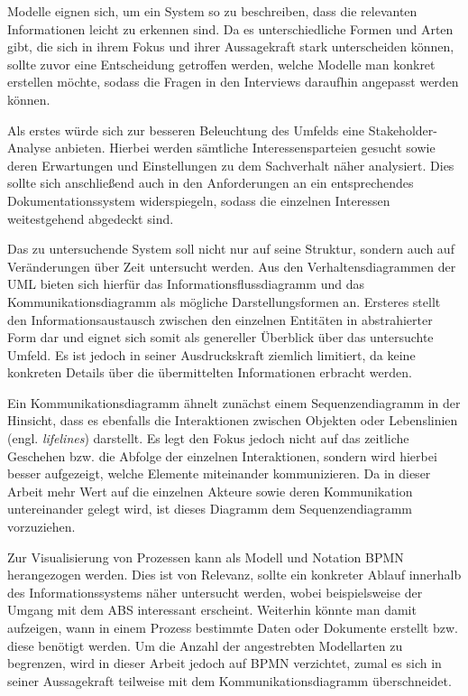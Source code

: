 Modelle eignen sich, um ein System so zu beschreiben, dass die relevanten Informationen leicht zu erkennen sind. Da es unterschiedliche Formen und Arten gibt, die sich in ihrem Fokus und ihrer Aussagekraft stark unterscheiden können, sollte zuvor eine Entscheidung getroffen werden, welche Modelle man konkret erstellen möchte, sodass die Fragen in den Interviews daraufhin angepasst werden können.

Als erstes würde sich zur besseren Beleuchtung des Umfelds eine Stakeholder-Analyse anbieten. Hierbei werden sämtliche Interessensparteien gesucht sowie deren Erwartungen und Einstellungen zu dem Sachverhalt näher analysiert. Dies sollte sich anschließend auch in den Anforderungen an ein entsprechendes Dokumentationssystem widerspiegeln, sodass die einzelnen Interessen weitestgehend abgedeckt sind.

Das zu untersuchende System soll nicht nur auf seine Struktur, sondern auch auf Veränderungen über Zeit untersucht werden. Aus den Verhaltensdiagrammen der UML bieten sich hierfür das Informationsflussdiagramm und das Kommunikationsdiagramm als mögliche Darstellungsformen an. Ersteres stellt den Informationsaustausch zwischen den einzelnen Entitäten in abstrahierter Form dar und eignet sich somit als genereller Überblick über das untersuchte Umfeld. Es ist jedoch in seiner Ausdruckskraft ziemlich limitiert, da keine konkreten Details über die übermittelten Informationen erbracht werden.

Ein Kommunikationsdiagramm ähnelt zunächst einem Sequenzendiagramm in der Hinsicht, dass es ebenfalls die Interaktionen zwischen Objekten oder Lebenslinien (engl. \textit{lifelines}) darstellt. Es legt den Fokus jedoch nicht auf das zeitliche Geschehen bzw. die Abfolge der einzelnen Interaktionen, sondern wird hierbei besser aufgezeigt, welche Elemente miteinander kommunizieren. Da in dieser Arbeit mehr Wert auf die einzelnen Akteure sowie deren Kommunikation untereinander gelegt wird, ist dieses Diagramm dem Sequenzendiagramm vorzuziehen.

Zur Visualisierung von Prozessen kann als Modell und Notation BPMN herangezogen werden. Dies ist von Relevanz, sollte ein konkreter Ablauf innerhalb des Informationssystems näher untersucht werden, wobei beispielsweise der Umgang mit dem ABS interessant erscheint. Weiterhin könnte man damit aufzeigen, wann in einem Prozess bestimmte Daten oder Dokumente erstellt bzw. diese benötigt werden. Um die Anzahl der angestrebten Modellarten zu begrenzen, wird in dieser Arbeit jedoch auf BPMN verzichtet, zumal es sich in seiner Aussagekraft teilweise mit dem Kommunikationsdiagramm überschneidet.

